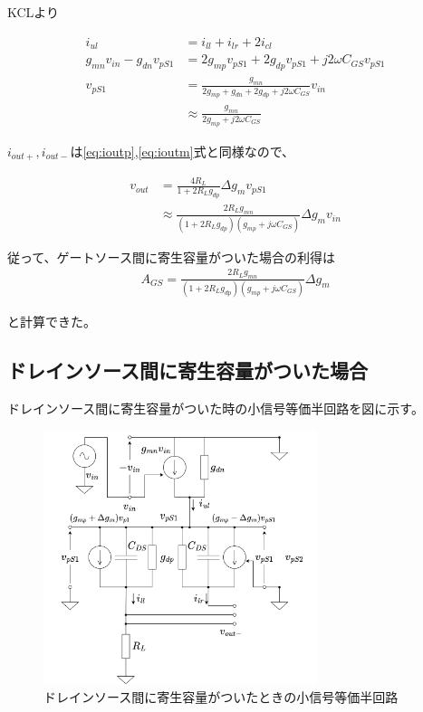 \documentclass[twocolumn]{jsarticle}
\begin{document}
        KCLより

        \begin{align*}
            i_{ul} &= i_{ll}+i_{lr}+2i_{cl}     \\
            g_{mn}v_{in}-g_{dn}v_{pS1} &= 2g_{mp}v_{pS1}+2g_{dp}v_{pS1}+j2\omega C_{GS}v_{pS1}  \\
            v_{pS1} &= \frac{g_{mn}}{2g_{mp}+g_{dn}+2g_{dp}+j2\omega C_{GS}}v_{in}      \\
            &\approx \frac{g_{mn}}{2g_{mp}+j2\omega C_{GS}}     \label{eq:vps1_gs}
        \end{align*}

        $i_{out+},i_{out-}$は\eqref{eq:ioutp},\eqref{eq:ioutm}式と同様なので、

        \begin{align*}
            v_{out} &= \frac{4R_{L}}{1+2R_{L}g_{dp}}\Delta g_{m}v_{pS1}     \\
            &\approx\frac{2R_{L}g_{mn}}{( 1+2R_{L}g_{dp} )( g_{mp}+j\omega C_{GS} )}\Delta g_{m} v_{in}
        \end{align*}

        従って、ゲートソース間に寄生容量がついた場合の利得は
        \begin{align*}
            A_{GS} = \frac{2R_{L}g_{mn}}{( 1+2R_{L}g_{dp} )( g_{mp}+j\omega C_{GS} )}\Delta g_{m}   \tag{7}
        \end{align*}
    
        と計算できた。

        \subsection{ドレインソース間に寄生容量がついた場合}
            ドレインソース間に寄生容量がついた時の小信号等価半回路を図に示す。

            \begin{figure}[h]
                \begin{center}
                    \includegraphics*[width=80mm]{figures/FoldedGilbert_DS_Half_Equivalent.png}
                    \caption{ドレインソース間に寄生容量がついたときの小信号等価半回路}
                    \label{fig:eq_ds}
                \end{center}
            \end{figure}
\end{document}
